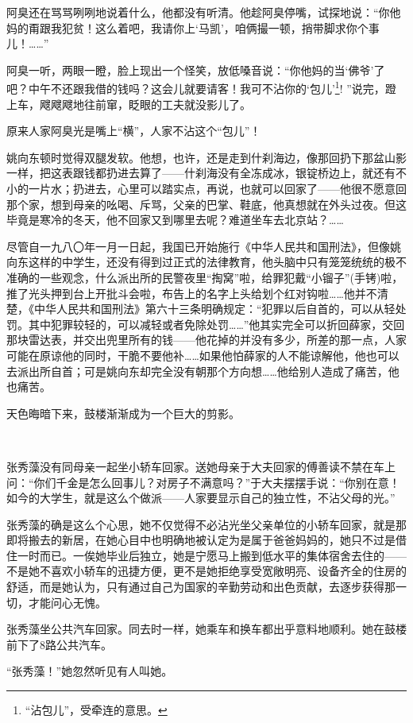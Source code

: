 \par 阿臭还在骂骂咧咧地说着什么，他都没有听清。他趁阿臭停嘴，试探地说：“你他妈的甭跟我犯贫！这么着吧，我请你上‘马凯’，咱俩撮一顿，捎带脚求你个事儿！……”
\par 阿臭一听，两眼一瞪，脸上现出一个怪笑，放低嗓音说：“你他妈的当‘佛爷’了吧？中午不还跟我借的钱吗？这会儿就要请客！我可不沾你的‘包儿’\footnote{“沾包儿”，受牵连的意思。}! ”说完，蹬上车，飕飕飕地往前窜，眨眼的工夫就没影儿了。
\par 原来人家阿臭光是嘴上“横”，人家不沾这个“包儿”！
\par 姚向东顿时觉得双腿发软。他想，也许，还是走到什刹海边，像那回扔下那盆山影一样，把这表跟钱都扔进去算了——什刹海没有全冻成冰，银锭桥边上，就还有不小的一片水；扔进去，心里可以踏实点，再说，也就可以回家了——他很不愿意回那个家，想到母亲的吆喝、斥骂，父亲的巴掌、鞋底，他真想就在外头过夜。但这毕竟是寒冷的冬天，他不回家又到哪里去呢？难道坐车去北京站？……
\par 尽管自一九八〇年一月一日起，我国已开始施行《中华人民共和国刑法》，但像姚向东这样的中学生，还没有得到过正式的法律教育，他头脑中只有笼笼统统的极不准确的一些观念，什么派出所的民警夜里“掏窝”啦，给罪犯戴“小镏子”(手铐)啦，推了光头押到台上开批斗会啦，布告上的名字上头给划个红对钩啦……他并不清楚，《中华人民共和国刑法》第六十三条明确规定：“犯罪以后自首的，可以从轻处罚。其中犯罪较轻的，可以减轻或者免除处罚……”他其实完全可以折回薛家，交回那块雷达表，并交出兜里所有的钱——他花掉的并没有多少，所差的那一点，人家可能在原谅他的同时，干脆不要他补……如果他怕薛家的人不能谅解他，他也可以去派出所自首；可是姚向东却完全没有朝那个方向想……他给别人造成了痛苦，他也痛苦。
\par 天色晦暗下来，鼓楼渐渐成为一个巨大的剪影。
\par  
\par 张秀藻没有同母亲一起坐小轿车回家。送她母亲于大夫回家的傅善读不禁在车上问：“你们千金是怎么回事儿？对房子不满意吗？”于大夫摆摆手说：“你别在意！如今的大学生，就是这么个做派——人家要显示自己的独立性，不沾父母的光。”
\par 张秀藻的确是这么个心思，她不仅觉得不必沾光坐父亲单位的小轿车回家，就是那即将搬去的新居，在她心目中也明确地被认定为是属于爸爸妈妈的，她只不过是借住一时而已。一俟她毕业后独立，她是宁愿马上搬到低水平的集体宿舍去住的——不是她不喜欢小轿车的迅捷方便，更不是她拒绝享受宽敞明亮、设备齐全的住房的舒适，而是她认为，只有通过自己为国家的辛勤劳动和出色贡献，去逐步获得那一切，才能问心无愧。
\par 张秀藻坐公共汽车回家。同去时一样，她乘车和换车都出乎意料地顺利。她在鼓楼前下了8路公共汽车。
\par “张秀藻！”她忽然听见有人叫她。

